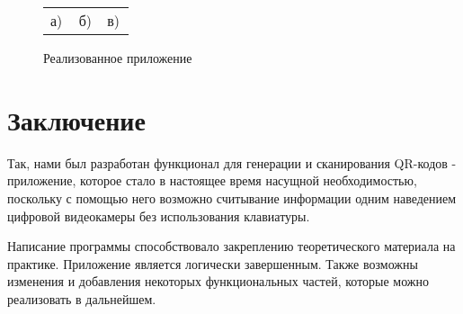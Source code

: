 \documentclass[a4paper,12pt]{article}
\begin{document}
\begin{figure}[H]
\begin{minipage}[h]{0.32\linewidth}
\end{minipage}
\hfill
\begin{minipage}[h]{0.32\linewidth}
\end{minipage}
\hfill
\begin{minipage}[h]{0.32\linewidth}
\end{minipage}
\begin{minipage}[h]{1\linewidth}
\begin{tabular}{p{0.32\linewidth}p{0.32\linewidth}p{0.32\linewidth}}
\centering а) & \centering б) & \centering в) \\
\end{tabular}
\end{minipage}
\vspace*{-1cm}
\caption{Реализованное приложение}
\label{ris:correlationsignals}
\end{figure}


\section*{Заключение}

Так, нами был разработан функционал для генерации и сканирования QR-кодов - приложение, которое стало в настоящее время насущной необходимостью, поскольку с помощью него возможно считывание информации одним наведением цифровой видеокамеры без использования клавиатуры. 

Написание программы способствовало закреплению теоретического материала на практике. Приложение является логически завершенным. Также возможны изменения и добавления некоторых функциональных частей, которые можно реализовать в дальнейшем.
\end{document}
